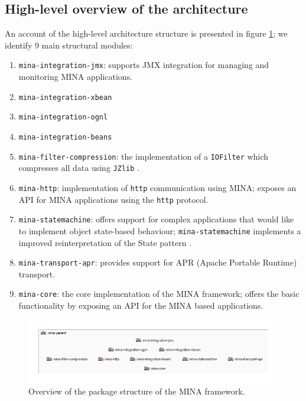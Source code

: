\subsection{High-level overview of the architecture}
\label{sec:archi_overview}
An account of the high-level architecture structure is presented in figure \ref{fig:packages_structure}; we identify 9 main structural modules:
\begin{enumerate}
    \item \texttt{mina-integration-jmx}: supports JMX integration for managing and monitoring MINA applications.
    \item \texttt{mina-integration-xbean}
    \item \texttt{mina-integration-ognl}
    \item \texttt{mina-integration-beans}
    \item \texttt{mina-filter-compression}: the implementation of a \texttt{IOFilter} which compresses all data using \texttt{JZlib} \cite{jzlib}.
    \item \texttt{mina-http}: implementation of \texttt{http} communication using MINA; exposes an API for MINA applications using the \texttt{http} protocol.
    \item \texttt{mina-statemachine}: offers support for complex applications that would like to implement object state-based behaviour; \texttt{mina-statemachine} implements a improved reinterpretation of the State pattern \cite{state_pattern}.
    \item \texttt{mina-transport-apr}: provides support for APR (Apache Portable Runtime)\cite{apr} transport.
    \item \texttt{mina-core}: the core implementation of the MINA framework; offers the basic functionality by exposing an API for the MINA based applications.
    
\end{enumerate}

\begin{figure}[H]
    \centering
    \includegraphics[width=\textwidth]{images/MINA_packages_overview.png}
    \caption{Overview of the package structure of the MINA framework.}
    \label{fig:packages_structure}
\end{figure}

